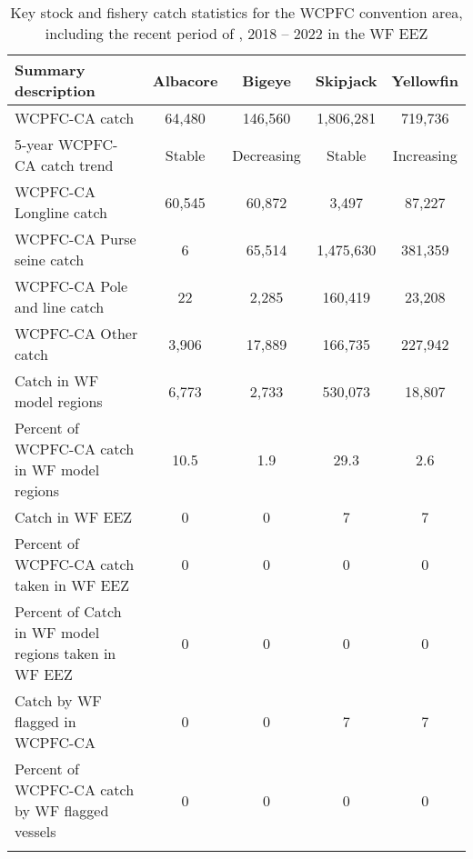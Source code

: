 \begin{longtable}{lcccc}
\caption{Key stock and fishery catch statistics for the WCPFC convention area, including the recent period of , 2018 -- 2022 in the WF EEZ} \\ 
  \hline
Summary description & Albacore & Bigeye & Skipjack & Yellowfin \\ 
  \hline
WCPFC-CA catch & 64,480 & 146,560 & 1,806,281 & 719,736 \\ 
  5-year WCPFC-CA catch trend & Stable & Decreasing & Stable & Increasing \\ 
  WCPFC-CA Longline catch & 60,545 & 60,872 & 3,497 & 87,227 \\ 
  WCPFC-CA Purse seine catch & 6 & 65,514 & 1,475,630 & 381,359 \\ 
  WCPFC-CA Pole and line catch & 22 & 2,285 & 160,419 & 23,208 \\ 
  WCPFC-CA Other catch & 3,906 & 17,889 & 166,735 & 227,942 \\ 
  Catch in WF model regions & 6,773 & 2,733 & 530,073 & 18,807 \\ 
  Percent of WCPFC-CA catch in WF model regions & 10.5 & 1.9 & 29.3 & 2.6 \\ 
   \hline
Catch in WF EEZ & 0 & 0 & 7 & 7 \\ 
  Percent of WCPFC-CA catch taken in WF EEZ & 0 & 0 & 0 & 0 \\ 
  Percent of Catch in WF model regions taken in WF EEZ & 0 & 0 & 0 & 0 \\ 
  Catch by WF flagged in WCPFC-CA & 0 & 0 & 7 & 7 \\ 
  Percent of WCPFC-CA catch by WF flagged vessels & 0 & 0 & 0 & 0 \\ 
  \hline
\label{cat_sum_tab}
\end{longtable}
